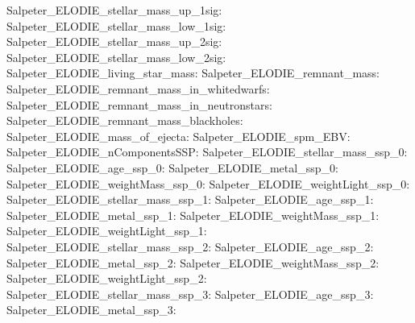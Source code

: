 Salpeter\_ELODIE\_stellar\_mass\_up\_1sig:  \newline 
Salpeter\_ELODIE\_stellar\_mass\_low\_1sig:  \newline 
Salpeter\_ELODIE\_stellar\_mass\_up\_2sig:  \newline 
Salpeter\_ELODIE\_stellar\_mass\_low\_2sig:  \newline 
Salpeter\_ELODIE\_living\_star\_mass:  \newline 
Salpeter\_ELODIE\_remnant\_mass:  \newline 
Salpeter\_ELODIE\_remnant\_mass\_in\_whitedwarfs:  \newline 
Salpeter\_ELODIE\_remnant\_mass\_in\_neutronstars:  \newline 
Salpeter\_ELODIE\_remnant\_mass\_blackholes:  \newline 
Salpeter\_ELODIE\_mass\_of\_ejecta:  \newline 
Salpeter\_ELODIE\_spm\_EBV:  \newline 
Salpeter\_ELODIE\_nComponentsSSP:  \newline 
Salpeter\_ELODIE\_stellar\_mass\_ssp\_0:  \newline 
Salpeter\_ELODIE\_age\_ssp\_0:  \newline 
Salpeter\_ELODIE\_metal\_ssp\_0:  \newline 
Salpeter\_ELODIE\_weightMass\_ssp\_0:  \newline 
Salpeter\_ELODIE\_weightLight\_ssp\_0:  \newline 
Salpeter\_ELODIE\_stellar\_mass\_ssp\_1:  \newline 
Salpeter\_ELODIE\_age\_ssp\_1:  \newline 
Salpeter\_ELODIE\_metal\_ssp\_1:  \newline 
Salpeter\_ELODIE\_weightMass\_ssp\_1:  \newline 
Salpeter\_ELODIE\_weightLight\_ssp\_1:  \newline 
Salpeter\_ELODIE\_stellar\_mass\_ssp\_2:  \newline 
Salpeter\_ELODIE\_age\_ssp\_2:  \newline 
Salpeter\_ELODIE\_metal\_ssp\_2:  \newline 
Salpeter\_ELODIE\_weightMass\_ssp\_2:  \newline 
Salpeter\_ELODIE\_weightLight\_ssp\_2:  \newline 
Salpeter\_ELODIE\_stellar\_mass\_ssp\_3:  \newline 
Salpeter\_ELODIE\_age\_ssp\_3:  \newline 
Salpeter\_ELODIE\_metal\_ssp\_3:  \newline 
